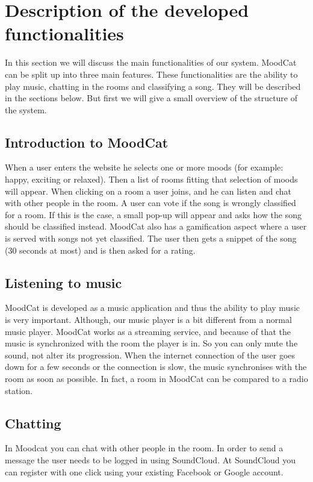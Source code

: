 \chapter{Description of the developed functionalities}

In this section we will discuss the main functionalities of our system.
MoodCat can be split up into three main features.
These functionalities are the ability to play music, chatting in the rooms and classifying a song.
They will be described in the sections below.
But first we will give a small overview of the structure of the system.

\section{Introduction to MoodCat}
When a user enters the website he selects one or more moods (for example: happy, exciting or relaxed).
Then a list of rooms fitting that selection of moods will appear.
When clicking on a room a user joins, and he can listen and chat with other people in the room.
A user can vote if the song is wrongly classified for a room.
If this is the case, a small pop-up will appear and asks how the song should be classified instead.
MoodCat also has a gamification aspect where a user is served with songs not yet classified. The user then gets a snippet of the song (30 seconds at most) and is then asked for a rating.

\section{Listening to music}
MoodCat is developed as a music application and thus the ability to play music is very important.
Although, our music player is a bit different from a normal music player.
MoodCat works as a streaming service, and because of that the music is synchronized with the room the player is in.  
So you can only mute the sound, not alter its progression.
When the internet connection of the user goes down for a few seconds or the connection is slow, the music synchronises with the room as soon as possible.
In fact, a room in MoodCat can be compared to a radio station.

\section{Chatting}
In Moodcat you can chat with other people in the room.
In order to send a message the user needs to be logged in using SoundCloud.
At SoundCloud you can register with one click using your existing Facebook or Google account.

